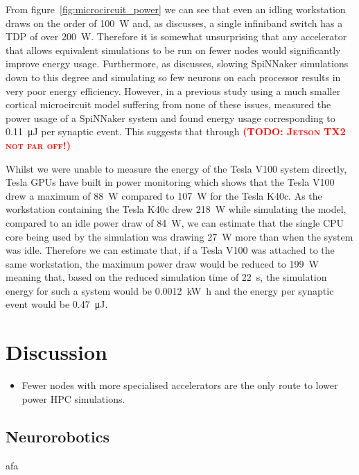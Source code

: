 \documentclass[utf8]{frontiersSCNS} %
\newcommand{\todo}[1]{\textbf{\textsc{\textcolor{red}{(TODO: #1)}}}}
\begin{document}
From figure~\ref{fig:microcircuit_power} we can see that even an idling workstation draws on the order of \SI{100}{\watt} and, as \citeauthor{VanAlbada2018} discusses, a single infiniband switch has a TDP of over \SI{200}{\watt}.
Therefore it is somewhat unsurprising that any accelerator that allows equivalent simulations to be run on fewer nodes would significantly improve energy usage.
Furthermore, as \citeauthor{VanAlbada2018} discusses, slowing SpiNNaker simulations down to this degree and simulating so few neurons on each processor results in very poor energy efficiency.
However, in a previous study using a much smaller cortical microcircuit model suffering from none of these issues, \citet{Sharp2012} measured the power usage of a SpiNNaker system and found energy usage corresponding to \SI{0.11}{\micro\joule} per synaptic event.
This suggests that through \todo{Jetson TX2 not far off!}

Whilst we were unable to measure the energy of the Tesla V100 system directly, Tesla GPUs have built in power monitoring which shows that the Tesla V100 drew a maximum of \SI{88}{\watt} compared to \SI{107}{\watt} for the Tesla K40c.
As the workstation containing the Tesla K40c drew \SI{218}{\watt} while simulating the model, compared to an idle power draw of \SI{84}{\watt}, we can estimate that the single CPU core being used by the simulation was drawing \SI{27}{\watt} more than when the system was idle.
Therefore we can estimate that, if a Tesla V100 was attached to the same workstation, the maximum power draw would be reduced to \SI{199}{\watt} meaning that, based on the reduced simulation time of \SI{22}{\second}, the simulation energy for such a system would be \SI{0.0012}{\kilo\watt\hour} and the energy per synaptic event would be \SI{0.47}{\micro\joule}.

\section{Discussion}
\begin{itemize}
    \item Fewer nodes with more specialised accelerators are the only route to lower power HPC simulations.
\end{itemize}

\subsection{Neurorobotics}
\label{sec:discussion/neurobotics}
afa
\end{document}
